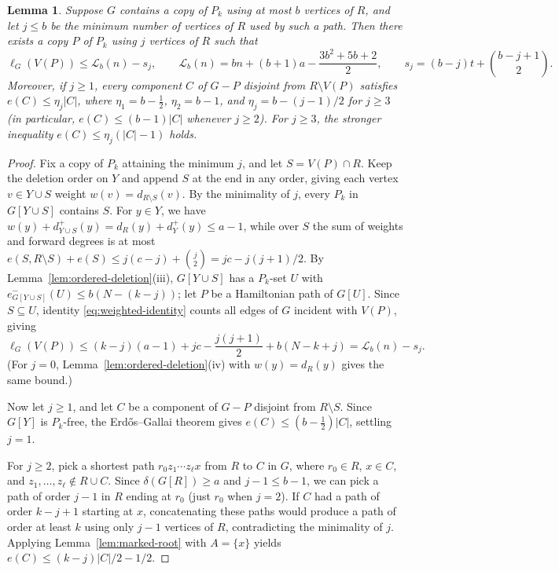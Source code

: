 \documentclass[10pt]{article}
\theoremstyle{compactplain}
\newtheorem{lemma}[theorem]{Lemma}
\theoremstyle{remark}\newtheorem{remark}[theorem]{Remark}
\begin{document}
\begin{lemma}\label{lem:path-loss}
Suppose $G$ contains a copy of $P_k$ using at most $b$ vertices of $R$,
and let $j\le b$ be the minimum number of vertices of $R$ used by such a
path. Then there exists a copy $P$ of $P_k$ using $j$ vertices of $R$
such that
\[
 \ell_G(V(P))\le\mathcal{L}_b(n)-s_j,\qquad
 \mathcal{L}_b(n)=bn+(b+1)a-\frac{3b^2+5b+2}{2},\qquad
 s_j=(b-j)t+\binom{b-j+1}{2}.
\]
Moreover, if $j\ge1$, every component $C$ of $G-P$ disjoint from
$R\setminus V(P)$ satisfies $e(C)\le\eta_j|C|$, where
$\eta_1=b-\tfrac{1}{2}$, $\eta_2=b-1$, and $\eta_j=b-(j-1)/2$ for
$j\ge3$ (in particular, $e(C)\le(b-1)|C|$ whenever $j\ge2$). For
$j\ge3$, the stronger inequality $e(C)\le\eta_j(|C|-1)$ holds.
\end{lemma}
\begin{proof}
Fix a copy of $P_k$ attaining the minimum $j$, and let $S=V(P)\cap R$.
Keep the deletion order on $Y$ and append $S$ at the end in any order,
giving each vertex $v\in Y\cup S$ weight $w(v)=d_{R\setminus S}(v)$. By
the minimality of $j$, every $P_k$ in $G[Y\cup S]$ contains $S$. For
$y\in Y$, we have
$w(y)+d_{Y\cup S}^+(y)=d_R(y)+d_Y^+(y)\le a-1$, while over $S$ the sum
of weights and forward degrees is at most
$e(S,R\setminus S)+e(S)\le j(c-j)+\binom{j}{2}=jc-j(j+1)/2$. By
Lemma~\ref{lem:ordered-deletion}(iii), $G[Y\cup S]$ has a $P_k$-set $U$
with $e_{G[Y\cup S]}^-(U)\le b(N-(k-j))$; let $P$ be a Hamiltonian path
of $G[U]$. Since $S\subseteq U$, identity \eqref{eq:weighted-identity}
counts all edges of $G$ incident with $V(P)$, giving
\[
 \ell_G(V(P))\le(k-j)(a-1)+jc-\frac{j(j+1)}{2}+b(N-k+j)
 =\mathcal{L}_b(n)-s_j.
\]
(For $j=0$, Lemma~\ref{lem:ordered-deletion}(iv) with $w(y)=d_R(y)$
gives the same bound.)

Now let $j\ge1$, and let $C$ be a component of $G-P$ disjoint from
$R\setminus S$. Since $G[Y]$ is $P_k$-free, the Erd\H{o}s--Gallai
theorem gives $e(C)\le(b-\tfrac{1}{2})|C|$, settling $j=1$.

For $j\ge2$, pick a shortest path $r_0z_1\cdots z_\ell x$ from $R$ to
$C$ in $G$, where $r_0\in R$, $x\in C$, and
$z_1,\ldots,z_\ell\notin R\cup C$. Since $\delta(G[R])\ge a$ and
$j-1\le b-1$, we can pick a path of order $j-1$ in $R$ ending at $r_0$
(just $r_0$ when $j=2$). If $C$ had a path of order $k-j+1$ starting at
$x$, concatenating these paths would produce a path of order at least
$k$ using only $j-1$ vertices of $R$, contradicting the minimality of
$j$. Applying Lemma~\ref{lem:marked-root} with $A=\{x\}$ yields
$e(C)\le(k-j)|C|/2-1/2$.


\end{proof}
\end{document}
